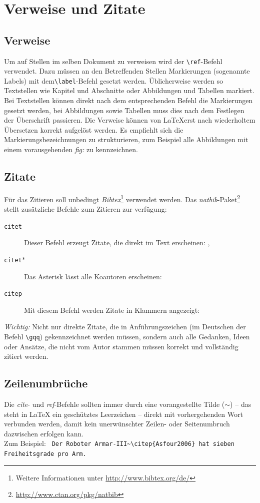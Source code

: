 \documentclass[english,ngerman]{KITreprt}
\begin{document}
\section{Verweise und Zitate}
\subsection{Verweise}
\label{sec:ref}
Um auf Stellen im selben Dokument zu verweisen wird der \lstinline[language={[LaTeX]TeX}]!\ref!-Befehl verwendet.
Dazu m\"ussen an den Betreffenden Stellen Markierungen (sogenannte Labels) mit dem\lstinline[language={[LaTeX]TeX}]!\label!-Befehl gesetzt werden.
\"Ublicherweise werden so Textstellen wie Kapitel und Abschnitte oder Abbildungen und Tabellen markiert.
Bei Textstellen k\"onnen direkt nach dem entsprechenden Befehl die Markierungen gesetzt werden, bei Abbildungen sowie Tabellen muss dies nach dem Festlegen der \"Uberschrift passieren. 
Die Verweise k\"onnen von \LaTeX erst nach wiederholtem \"Ubersetzen korrekt aufgel\"ost werden.
Es empfiehlt sich die Markierungsbezeichnungen zu strukturieren, zum Beispiel alle Abbildungen mit einem vorausgehenden \emph{fig:} zu kennzeichnen.
\subsection{Zitate}
F\"ur das Zitieren soll unbedingt \emph{Bibtex}\footnote{Weitere Informationen unter \url{http://www.bibtex.org/de/}} verwendet werden.
Das \emph{natbib}-Paket\footnote{\url{http://www.ctan.org/pkg/natbib}} stellt zus\"atzliche Befehle zum Zitieren zur verf\"ugung:
\begin{description}
\item[\texttt{citet}] Dieser Befehl erzeugt Zitate, die direkt im Text erscheinen: \citet{jan_ICRA_2016}, 
\item[\texttt{citet}$\ast$] Das Asterisk l\"asst alle Koautoren erscheinen: \citet*{Asfour2006}
\item[\texttt{citep}] Mit diesem Befehl werden Zitate in Klammern angezeigt: \citep{Asfour2006}
\end{description}
\emph{Wichtig:} Nicht nur direkte Zitate, die in Anf\"uhrungszeichen (im Deutschen der Befehl \lstinline[language={[LaTeX]TeX}]!\gqq!) gekennzeichnet werden m\"ussen, sondern auch alle Gedanken, Ideen oder Ans\"atze,
die nicht vom Autor stammen m\"ussen korrekt und vollst\"andig zitiert werden.
\subsection{Zeilenumbr\"uche}
Die \emph{cite}- und \emph{ref}-Befehle sollten immer durch eine vorangestellte Tilde ($\sim$) -- das steht in \LaTeX{} ein gesch\"utztes Leerzeichen -- direkt mit vorhergehenden Wort verbunden werden, damit kein unerw\"unschter
Zeilen- oder Seitenumbruch dazwischen erfolgen kann.\\
Zum Beispiel: \lstinline[language={[LaTeX]TeX},morekeywords={citep}]! Der Roboter Armar-III~\citep{Asfour2006} hat sieben Freiheitsgrade pro Arm.!
\end{document}
